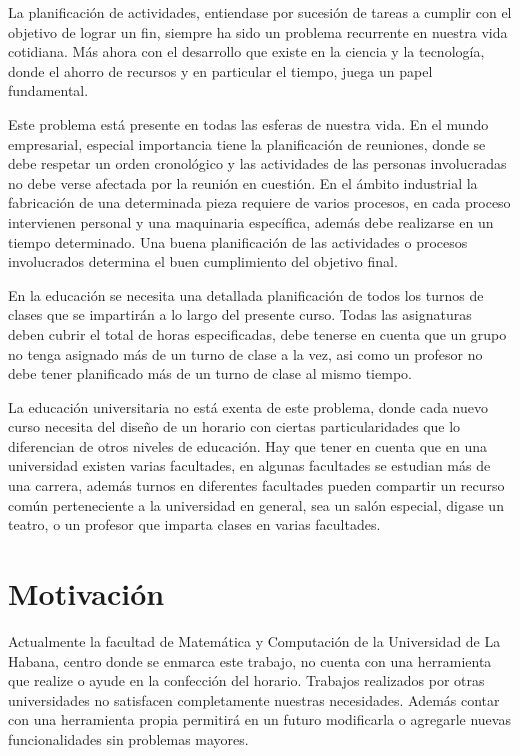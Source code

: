 \begin{introduction}

La planificación de actividades, entiendase por sucesión de tareas a cumplir
con el objetivo de lograr un fin, siempre ha sido un problema recurrente en nuestra
vida cotidiana. Más ahora con el desarrollo que existe en la ciencia y la tecnología,
donde el ahorro de recursos y en particular el tiempo, juega un papel fundamental.

Este problema está presente en todas las esferas de nuestra vida. En el mundo empresarial,
especial importancia tiene la planificación de reuniones, donde se debe respetar un
orden cronológico y las actividades de las personas involucradas no debe verse afectada
por la reunión en cuestión. En el ámbito industrial la fabricación de una determinada
pieza requiere de varios procesos, en cada proceso intervienen personal y una maquinaria
específica, además debe realizarse en un tiempo determinado. Una buena planificación
de las actividades o procesos involucrados determina el buen cumplimiento del objetivo
final.

En la educación se necesita una detallada planificación de todos los turnos de clases que se
impartirán a lo largo del presente curso. Todas las asignaturas deben cubrir el total de horas
especificadas, debe tenerse en cuenta que un grupo no tenga asignado más de un turno de clase
a la vez, asi como un profesor no debe tener planificado más de un turno de clase al mismo tiempo.

La educación universitaria no está exenta de este problema, donde cada nuevo curso necesita del
diseño de un horario con ciertas particularidades que lo diferencian de otros niveles de educación.
Hay que tener en cuenta que en una universidad existen varias facultades, en algunas facultades se
estudian más de una carrera, además turnos en diferentes facultades pueden compartir un recurso común
perteneciente a la universidad en general, sea un salón especial, digase un teatro, o un profesor
que imparta clases en varias facultades.

\section*{Motivación}

Actualmente la facultad de Matemática y Computación de la Universidad de La Habana, centro donde 
se enmarca este trabajo, no cuenta con una herramienta que realize o ayude en la confección del horario.
Trabajos realizados por otras universidades no satisfacen completamente nuestras necesidades.
Además contar con una herramienta propia permitirá en un futuro modificarla o agregarle nuevas
funcionalidades sin problemas mayores.


\end{introduction}
